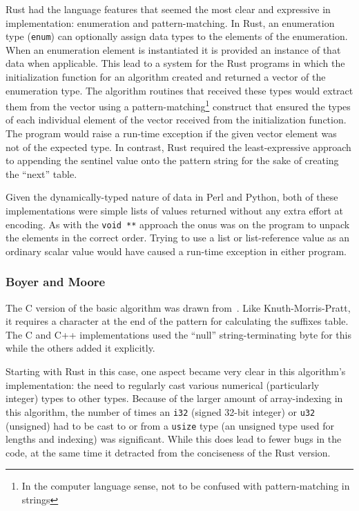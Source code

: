 Rust had the language features that seemed the most clear and expressive in implementation: enumeration and pattern-matching. In Rust, an enumeration type (\texttt{enum}) can optionally assign data types to the elements of the enumeration. When an enumeration element is instantiated it is provided an instance of that data when applicable. This lead to a system for the Rust programs in which the initialization function for an algorithm created and returned a vector of the enumeration type. The algorithm routines that received these types would extract them from the vector using a pattern-matching\footnote{In the computer language sense, not to be confused with pattern-matching in strings} construct that ensured the types of each individual element of the vector received from the initialization function. The program would raise a run-time exception if the given vector element was not of the expected type. In contrast, Rust required the least-expressive approach to appending the sentinel value onto the pattern string for the sake of creating the ``next'' table.

Given the dynamically-typed nature of data in Perl and Python, both of these implementations were simple lists of values returned without any extra effort at encoding. As with the \texttt{void~**} approach the onus was on the program to unpack the elements in the correct order. Trying to use a list or list-reference value as an ordinary scalar value would have caused a run-time exception in either program.

\subsubsection{Boyer and Moore}

The C version of the basic algorithm was drawn from~\cite[Chapter 14]{handbook}. Like Knuth-Morris-Pratt, it requires a character at the end of the pattern for calculating the suffixes table. The C and C++ implementations used the ``null'' string-terminating byte for this while the others added it explicitly.

Starting with Rust in this case, one aspect became very clear in this algorithm's implementation: the need to regularly cast various numerical (particularly integer) types to other types. Because of the larger amount of array-indexing in this algorithm, the number of times an \texttt{i32} (signed 32-bit integer) or \texttt{u32} (unsigned) had to be cast to or from a \texttt{usize} type (an unsigned type used for lengths and indexing) was significant. While this does lead to fewer bugs in the code, at the same time it detracted from the conciseness of the Rust version.

